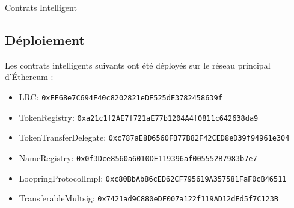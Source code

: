 \documentclass[UTF8,nofonts]{article}
\makeatletter
\newenvironment{figurehere}
 {\def\@captype{figure}}
 {}
\makeatother
\begin{document}
\begin{appendices}
\begin{center}
\begin{figurehere}
\caption{Contrats Intelligent}
\label{fig:smartcontracts}
\end{figurehere}
\end{center}

\subsection{Déploiement}

Les contrats intelligents suivants ont été déployés sur le réseau principal d'Éthereum :
\begin{itemize}
\item LRC: \verb|0xEF68e7C694F40c8202821eDF525dE3782458639f|
\item TokenRegistry: \verb|0xa21c1f2AE7f721aE77b1204A4f0811c642638da9|
\item TokenTransferDelegate: \verb|0xc787aE8D6560FB77B82F42CED8eD39f94961e304|
\item NameRegistry: \verb|0x0f3Dce8560a6010DE119396af005552B7983b7e7|
\item LoopringProtocolImpl: \verb|0xc80BbAb86cED62CF795619A357581FaF0cB46511|
\item TransferableMultsig: \verb|0x7421ad9C880eDF007a122f119AD12dEd5f7C123B|
\end{itemize}

\end{appendices}
\end{document}
